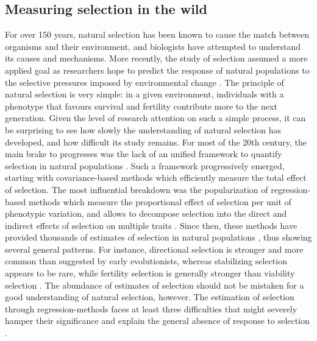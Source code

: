 \subsection{Measuring selection in the wild}
For over 150 years, natural selection has been known to cause the match between organisms and their environment, and biologists have attempted to understand its causes and mechanisms. More recently, the study of selection assumed a more applied goal as researchers hope to predict the response of natural populations to the selective pressures imposed by environmental change \parencite{Chevin2010a, Coulson2010, Merila2014}.
The principle of natural selection is very simple: in a given environment, individuals with a phenotype that favours survival and fertility contribute more to the next generation. Given the level of research attention on such a simple process, it can be surprising to see how slowly the understanding of natural selection has developed, and how difficult its study remains. 
For most of the 20th century, the main brake to progresses was the lack of an unified framework to quantify selection in natural populations \parencite{Wade2006}. Such a framework progressively emerged, starting with covariance-based methods \parencite{Robertson1966, Price1970} which efficiently measure the total effect of selection. The most influential breakdown was the popularization of regression-based methods \parencite{Lande1979,Lande1983} which measure the proportional effect of selection per unit of phenotypic variation, and allows to decompose selection into the direct and indirect effects of selection on multiple traits \parencite{Broodie1995}.
Since then, these methods have provided thousands of estimates of selection in natural populations \parencite{Kingsolver2001,Stinchcombe2008,Kingsolver2012}, thus showing several general patterns. For instance, directional selection is stronger and more common than suggested by early evolutionists, whereas stabilizing selection appears to be rare, while fertility selection is generally stronger than viability selection \parencite{Kingsolver2012}.
The abundance of estimates of selection should not be mistaken for a good understanding of natural selection, however. The estimation of selection through regression-methods faces at least three difficulties that might severely hamper their significance and explain the general absence of response to selection \parencite{Merila2001, Brookfield2016}.

